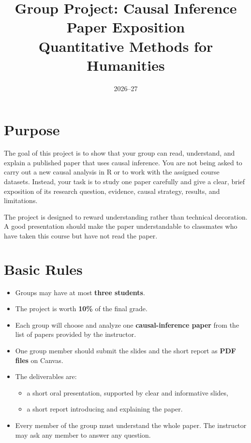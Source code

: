 \documentclass[12pt]{article}
\title{Group Project: Causal Inference Paper Exposition \\ Quantitative Methods for Humanities}
\author{}
\date{2026--27}
\begin{document}
\maketitle

\section*{Purpose}

The goal of this project is to show that your group can read, understand, and explain a published paper that uses causal inference. 
You are not being asked to carry out a new causal analysis in R or to work with the assigned course datasets. 
Instead, your task is to study one paper carefully and give a clear, 
brief exposition of its research question, evidence, causal strategy, results, and limitations.

The project is designed to reward understanding rather than technical decoration. 
A good presentation should make the paper understandable to classmates who have taken this course but have not read the paper.

\section*{Basic Rules}

\begin{itemize}
    \item Groups may have at most \textbf{three students}.
    \item The project is worth \textbf{10\%} of the final grade.
    \item Each group will choose and analyze one \textbf{causal-inference paper} from the list of papers provided by the instructor.
    \item One group member should submit the slides and the short report as \textbf{PDF files} on Canvas.
    \item The deliverables are:
    \begin{itemize}
        \item a short oral presentation, supported by clear and informative slides,
        \item a short report introducing and explaining the paper.
    \end{itemize} 
    \item Every member of the group must understand the whole paper. The instructor may ask any member to answer any question.
\end{itemize}
\end{document}
